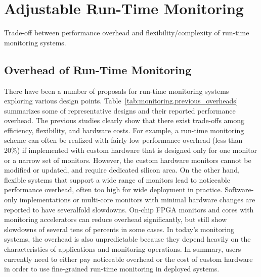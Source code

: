 \section{Adjustable Run-Time Monitoring}
\label{sec:monitoring}

\begin{table*}[t]
  \begin{center}
    \vspace{-0.0in}
    \begin{footnotesize}
    
    \end{footnotesize}
    \caption{Trade-off between performance overhead and flexibility/complexity of run-time monitoring systems.}
    \vspace{-0.2in}
    \label{tab:monitoring.previous_overheads}
  \end{center}
\end{table*}

\subsection{Overhead of Run-Time Monitoring}

There have been a number of proposals for run-time monitoring systems exploring various
design points. %
Table~\ref{tab:monitoring.previous_overheads} summarizes some of representative designs
and their reported performance overhead. The previous studies clearly show that there
exist trade-offs among efficiency, flexibility, and hardware costs. 
For example, a run-time monitoring scheme can often be realized with fairly low
performance overhead (less than 20\%) if implemented with custom hardware that is
designed only for one monitor or a narrow set of monitors. However, the custom
hardware monitors cannot be modified or updated, and require dedicated silicon area. 
On the other hand, flexible systems that support a wide range of monitors lead 
to noticeable performance overhead, often too high for wide deployment in practice.
Software-only implementations \cite{FIXME} or multi-core monitors with minimal
hardware changes \cite{lba-asid06} are reported to have severalfold slowdowns.
On-chip FPGA monitors \cite{flexcore-micro10} and cores with monitoring accelerators
\cite{lba-isca08, fade-hpca14} can reduce overhead significantly, but still show
slowdowns of several tens of percents in some cases.
In today's monitoring systems, the overhead is also unpredictable because they
depend heavily on the characteristics of applications and monitoring operations.
In summary, users currently need to either pay noticeable overhead or the cost of custom
hardware in order to use fine-grained run-time monitoring in deployed systems.

